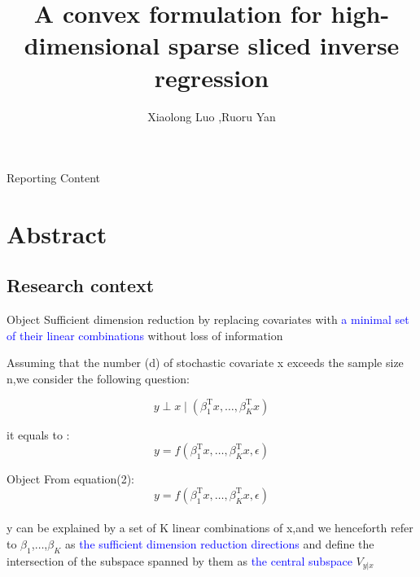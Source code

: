 \documentclass{beamer}
\title[SSIR reporting] 
{A convex formulation for high-dimensional sparse sliced inverse regression}
\author{Xiaolong Luo ,Ruoru Yan }
\institute[]
{
  
  School of management
  \and
 
  University of Science and Technology of China
 
}
\date 
{}
\begin{document}
\begin{frame}
  \titlepage
\end{frame}

\begin{frame}{Reporting Content}
  \tableofcontents
\end{frame}

\section{Abstract}

\subsection{Research context}
\begin{frame}{Object}
 \setlength{\parindent}{2em}  Sufficient dimension reduction by replacing covariates with \textcolor{blue}{a minimal set of their linear combinations} without loss of information 
  
  
 \setlength{\parindent}{2em} Assuming that the number (d) of stochastic covariate x exceeds the sample size n,we consider the following question:
 
 \begin{equation}
    y \perp x \mid\left(\beta_{1}^{\mathrm{T}} x, \ldots, \beta_{K}^{\mathrm{T}} x\right)
\end{equation}
  
  
  it equals to :
  \begin{equation}
     y=f\left(\beta_{1}^{\mathrm{T}} x, \ldots, \beta_{K}^{\mathrm{T}} x, \epsilon\right)
\end{equation}
\end{frame}

\begin{frame}{Object}
  From equation(2):
$$
    y=f\left(\beta_{1}^{\mathrm{T}} x, \ldots, \beta_{K}^{\mathrm{T}} x, \epsilon\right)
$$
\\
  \setlength{\parindent}{1em}y can be explained by a set of K linear combinations of x,and we henceforth refer to $\beta_{1}$,$\ldots$,$\beta_{K}$ as \textcolor{blue}{the sufficient dimension reduction directions} and define the intersection of the subspace spanned by them as \textcolor{blue}{the central subspace} $ V _{y|x} $    
\end{frame}
\end{document}
